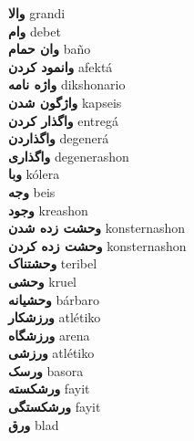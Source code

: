\textbf{ والا  } grandi \\
\textbf{ وام  } debet \\
\textbf{ وان حمام  } baño \\
\textbf{ وانمود کردن  } afektá \\
\textbf{ واژه نامه  } dikshonario \\
\textbf{ واژگون شدن  } kapseis \\
\textbf{ واگذار کردن  } entregá \\
\textbf{ واگذاردن  } degenerá \\
\textbf{ واگذاری  } degenerashon \\
\textbf{ وبا  } kólera \\
\textbf{ وجه  } beis \\
\textbf{ وجود  } kreashon \\
\textbf{ وحشت زده شدن  } konsternashon \\
\textbf{ وحشت زده کردن  } konsternashon \\
\textbf{ وحشتناک  } teribel \\
\textbf{ وحشی  } kruel \\
\textbf{ وحشیانه  } bárbaro \\
\textbf{ ورزشکار  } atlétiko \\
\textbf{ ورزشگاه  } arena \\
\textbf{ ورزشی  } atlétiko \\
\textbf{ ورسک  } basora \\
\textbf{ ورشکسته  } fayit \\
\textbf{ ورشکستگی  } fayit \\
\textbf{ ورق  } blad \\

